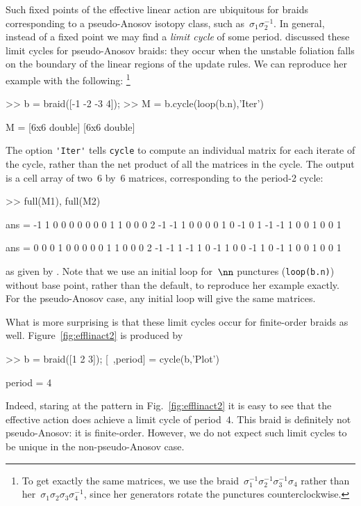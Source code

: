 \documentclass[12pt]{article}
\begin{document}
%
Such fixed points of the effective linear action are ubiquitous for braids
corresponding to a pseudo-Anosov isotopy class, such
as~$\sigma_1\sigma_2^{-1}$. %
In general, instead of a fixed point we may find a \emph{limit cycle} of some
period.  \citet{Yurttas2014_preprint} discussed these limit cycles for
pseudo-Anosov braids: they occur when the unstable foliation falls on the
boundary of the linear regions of the update rules.  We can reproduce her
example with the following:%
\footnote{To get exactly the same matrices, we use the
  braid~$\sigma_1^{-1}\sigma_2^{-1}\sigma_3^{-1}\sigma_4$ rather than
  her~$\sigma_1\sigma_2\sigma_3\sigma_4^{-1}$, since her generators rotate the
  punctures counterclockwise.}
%
\begin{lstbraidlab}
>> b = braid([-1 -2 -3 4]);
>> M = b.cycle(loop(b.n),'Iter')

M = [6x6 double]    [6x6 double]
\end{lstbraidlab}
The option \lstinline{'Iter'} tells \lstinline{cycle} to compute an individual
matrix for each iterate of the cycle, rather than the net product of all the
matrices in the cycle.  The output is a cell array %
%
of two~$6$ by~$6$ matrices, corresponding to the period-2 cycle:
\begin{lstbraidlab}
>> full(M{1}), full(M{2})

ans = -1     1     0     0     0     0
       0     0     0     1     1     0
       0     0     2    -1    -1     1
       0     0     0     0     1     0
      -1     0     1    -1    -1     1
       0     0     1     0     0     1

ans =  0     0     0     1     0     0
       0     0     0     1     1     0
       0     0     2    -1    -1     1
      -1     1     0    -1     1     0
       0    -1     1     0    -1     1
       0     0     1     0     0     1
\end{lstbraidlab}
as given by \citet{Yurttas2014_preprint}.  Note that we use an initial loop
for~$\nn$ punctures (\lstinline{loop(b.n)}) without base point, rather than
the default, to reproduce her example exactly.  For the pseudo-Anosov case,
any initial loop will give the same matrices.

What is more surprising is that these limit cycles occur for finite-order
braids as well.  Figure~\ref{fig:efflinact2} is produced by
\begin{lstbraidlab}
>> b = braid([1 2 3]); [~,period] = cycle(b,'Plot')

period = 4
\end{lstbraidlab}
Indeed, staring at the pattern in Fig.~\ref{fig:efflinact2} it is easy to see
that the effective action does achieve a limit cycle of period~$4$.  This
braid is definitely not pseudo-Anosov: it is finite-order.
%
However, we do not expect such limit cycles to be unique in the
non-pseudo-Anosov case.
\end{document}
